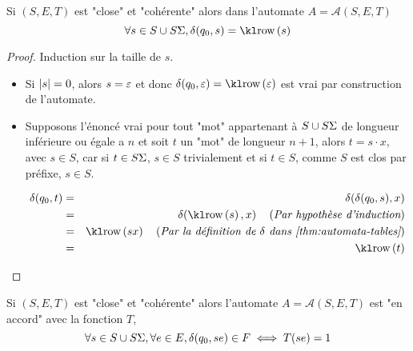 \begin{lemma} \label{lem:learning-9}
	Si $(S,E,T)$ est "close" et "cohérente" alors dans l'automate $A = \mathcal A (S,E,T)$
	$$\forall s \in S \cup S\alphabet, \delta(q_0,s) = \row s$$
\end{lemma}

\begin{proof}
	Induction sur la taille de $s$.
	\begin{itemize}
		\item Si $|s| = 0$, alors $s = \varepsilon$ et donc $\delta(q_0, \motvide) = \row \motvide$
		      est vrai par construction de l'automate.
		\item Supposons l'énoncé vrai pour tout "mot" appartenant à $S \cup S\Sigma$ de longueur inférieure ou égale a $n$ et
		      soit $t$ un "mot" de longueur $n +1$, alors $ t  = s \cdot x,$ avec $s \in S$, car
		      si $t \in S\Sigma$, $s \in S$ trivialement et si $t \in S$, comme $S$ est clos par préfixe, $s \in S$.

		      \begin{eqnarray*}
			      \delta(q_0, t) &=& \delta(\delta(q_0, s), x) \\
			      &=& \delta(\row s, x)  \reason {Par hypothèse d'induction} \\
			      &=& \row {sx}  \reason {Par la définition de $\delta$ dans \ref{thm:automata-tables}} \\
			      &=& \row t
		      \end{eqnarray*}
	\end{itemize}
\end{proof}


\begin{lemma}
	Si $(S,E,T)$ est "close" et "cohérente" alors l'automate $A = \mathcal A (S,E,T)$
	est "en accord" avec la fonction $T$, \ie
	$$\forall s \in S \cup S\Sigma, \forall e \in E, \delta(q_0,se) \in F \iff T(se) =1$$
\end{lemma}

